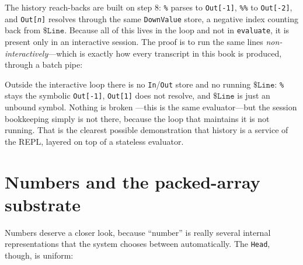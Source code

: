 The history reach-backs are built on step 8: \texttt{\%} parses to
\texttt{Out[-1]}, \texttt{\%\%} to \texttt{Out[-2]}, and \texttt{Out[\textit{n}]}
resolves through the same \texttt{DownValue} store, a negative index counting back from
\(\mathtt{\$Line}\). Because all of this lives in the loop and not in \texttt{evaluate},
it is present only in an interactive session. The proof is to run the same lines
\emph{non-interactively}---which is exactly how every transcript in this book is
produced, through a batch pipe:


Outside the interactive loop there is no \texttt{In}/\texttt{Out} store and no running
\(\mathtt{\$Line}\): \texttt{\%} stays the symbolic \texttt{Out[-1]}, \texttt{Out[1]}
does not resolve, and \(\mathtt{\$Line}\) is just an unbound symbol. Nothing is broken
---this is the same evaluator---but the session bookkeeping simply is not there,
because the loop that maintains it is not running. That is the clearest possible
demonstration that history is a service of the REPL, layered on top of a stateless
evaluator.

\section{Numbers and the packed-array substrate}
\label{sec:int-packed}

Numbers deserve a closer look, because ``number'' is really several internal
representations that the system chooses between automatically. The
\texttt{Head}, though, is uniform:

